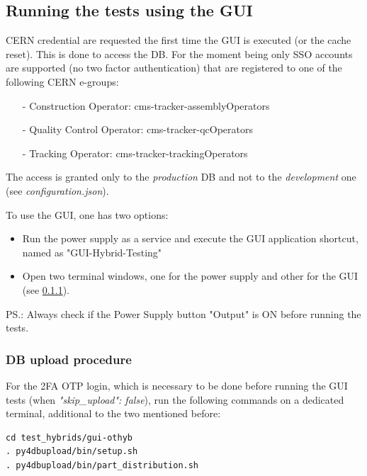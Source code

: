 \documentclass[10pt,a4paper]{article}
\begin{document}
\subsection{Running the tests using the GUI}

CERN credential are requested the first time the GUI is executed (or the cache reset). This is done to access the DB. For the moment being only SSO accounts are supported (no two factor authentication) that are registered to one of the following CERN e-groups:
\begin{itemize}
\item[-] Construction Operator: cms-tracker-assemblyOperators
\item[-] Quality Control Operator: cms-tracker-qcOperators
\item[-] Tracking Operator: cms-tracker-trackingOperators
\end{itemize}
The access is granted only to the {\it production} DB and not to the {\it development} one (see \emph{configuration.json}). 

To use the GUI, one has two options:

\begin{itemize}
    \item Run the power supply as a service and execute the GUI application shortcut, named as "GUI-Hybrid-Testing"
    \item Open two terminal windows, one for the power supply and other for the GUI (see \ref{DBup}).
\end{itemize}

PS.: Always check if the Power Supply button "Output" is ON before running the tests. 

\subsubsection{DB upload procedure}
\label{DBup}

For the 2FA OTP login, which is necessary to be done before running the GUI tests (when \emph{"skip\_upload": false}), run the following commands on a dedicated terminal, additional to the two mentioned before:

\begin{framed}
\begin{verbatim}
cd test_hybrids/gui-othyb
. py4dbupload/bin/setup.sh
. py4dbupload/bin/part_distribution.sh
\end{verbatim}
\end{framed}
\end{document}
